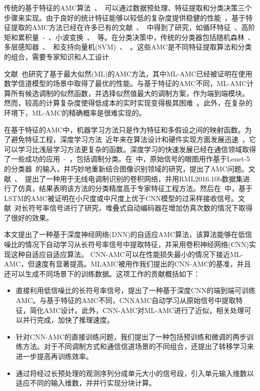 \documentclass[final]{cvpr}
\begin{document}
传统的基于特征的AMC算法~\cite{r3}、~\cite{r4}可以通过数据预处理、特征提取和分类决策三个步骤来实现。由于良好的统计特征能够以较低的复杂度提供稳健的性能~\cite{r5}，基于特征提取的AMC方法已经在许多已有的文献~\cite{r6}、~\cite{r7}中得到了研究，如循环特征~\cite{r8}、高阶矩和累积量~\cite{r9}-~\cite{r11}、小波变换~\cite{r12}、~\cite{r13}等。在分类决策中，传统的分类器包括随机森林~\cite{r14}、多层感知器~\cite{r15}、~\cite{r16}和支持向量机(SVM)~\cite{r17}、~\cite{r18}。这些AMC是不同特征提取算法和分类的组合，需要专家知识和人工设计

文献~\cite{r19}也研究了基于最大似然(ML)的AMC方法，其中ML-AMC已经被证明在使用数学信道模型的场景中取得了最优的性能。与基于特征的AMC不同，ML-AMC计算所有候选调制的似然函数，并选择似然值最大的调制方案，作为端到端模块。
然而，较高的计算复杂度使得低成本的实时实现变得极其困难~\cite{r20}。此外，在复杂的环境下，ML-AMC的精确概率是很难实现的。

在基于特征的AMC中，机器学习方法只是作为特征和多假设之间的映射函数。为了避免特征工程，深度学习方法~\cite{r21}近年来在算法设计和硬件实现方面发展迅速~\cite{r22}，它可以学习比浅层学习方法更复杂的函数。深度学习的快速发展已经在通信领域取得了一些成功的应用~\cite{r23}-~\cite{r25}，包括调制分类。在~\cite{r26}中，原始信号的眼图用作基于Lenet-5的分类器~\cite{r27}的输入，并巧妙地重新结合图像识别领域的研究，提出了AMC问题。文献~\cite{r28}、~\cite{r29}提出了一种用于无线电调制识别的卷积网络，并用RML2016.10b数据集进行了仿真，结果表明该方法的分类精度高于专家特征工程方法。然后在~\cite{r30}中，基于LSTM的AMC被证明在小尺度或中尺度上优于CNN模型的过采样接收信号。文献~\cite{r31}对长符号率信号进行了研究，堆叠式自动编码器在增加仿真次数的情况下取得了很好的效果。

本文提出了一种基于深度神经网络(DNN)的自适应AMC算法，该算法能够在低信噪比的情况下自动学习从长符号率信号中提取特征，并采用卷积神经网络(CNN)实现这种自适应自适应算法。
CNN-AMC可以在性能损失最小的情况下接近ML-AMC，但速度有显著提高。MLAMC被用作我们提出的CNN-AMC的基准，并且还可以生成不同场景下的训练数据。这项工作的贡献概括如下：
\begin{itemize}
\item 直接利用低信噪比的长符号率信号，提出了一种基于深度CNN的端到端可训练AMC。与基于特征的AMC不同，CNNAMC自动学习从原始信号中提取特征，简化AMC设计。此外，CNN-AMC对ML-AMC进行了近似，相关处理可以并行完成，加快了推理速度。
\item 针对CNN-AMC的直接训练问题，我们提出了一种包括预训练和微调的两步训练方法。对于不同调制方式和通信信道场景的不同组合，还提出了转移学习来进一步提高再训练效率。
\item 通过将经过长预处理的观测序列分成单元大小的信号段，引入单元输入维数以适应不同的输入维数，并并行实现分块计算。 
\end{itemize}
\end{document}

